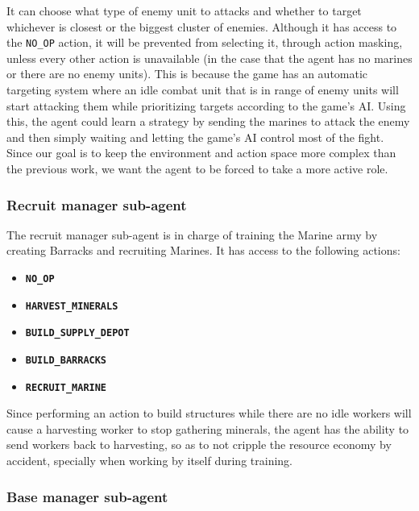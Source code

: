 It can choose what type of enemy unit to attacks and whether to target whichever is closest or the biggest cluster of enemies. Although it has access to the \texttt{NO\_OP} action, it will be prevented from selecting it, through action masking, unless every other action is unavailable (in the case that the agent has no marines or there are no enemy units). This is because the game has an automatic targeting system where an idle combat unit that is in range of enemy units will start attacking them while prioritizing targets according to the game's AI. Using this, the agent could learn a  strategy by sending the marines to attack the enemy and then simply waiting and letting the game's AI control most of the fight. Since our goal is to keep the environment and action space more complex than the previous work, we want the agent to be forced to take a more active role.

\subsubsection*{Recruit manager sub-agent}

The recruit manager sub-agent is in charge of training the Marine army by creating Barracks and recruiting Marines. It has access to the following actions:

\begin{multicols}{2}
\begin{itemize}
    \item \textbf{\texttt{NO\_OP}}
    \item \textbf{\texttt{HARVEST\_MINERALS}}
    \item \textbf{\texttt{BUILD\_SUPPLY\_DEPOT}}
    \item \textbf{\texttt{BUILD\_BARRACKS}}
    \item \textbf{\texttt{RECRUIT\_MARINE}}
\end{itemize}
\end{multicols}

Since performing an action to build structures while there are no idle workers will cause a harvesting worker to stop gathering minerals, the agent has the ability to send workers back to harvesting, so as to not cripple the resource economy by accident, specially when working by itself during training.

\subsubsection*{Base manager sub-agent}

